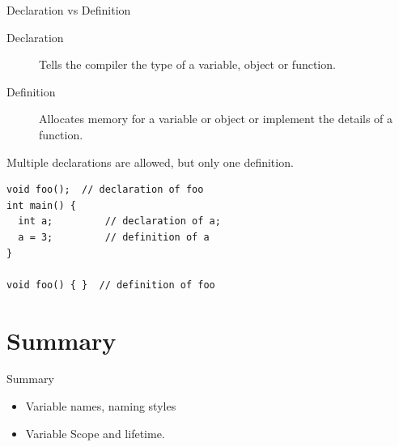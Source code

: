 \documentclass[presentation]{beamer}
\begin{document}
\begin{frame}[fragile,label={sec:orgheadline40}]{Declaration vs Definition}
 \begin{description}
\item[{Declaration}] Tells the compiler the type of a variable, object
or function.
\item[{Definition}] Allocates memory for a variable or object or
implement the details of a function.
\end{description}


Multiple declarations are allowed, but only one definition.

\begin{verbatim}
void foo();  // declaration of foo
int main() {
  int a;         // declaration of a;
  a = 3;         // definition of a
}

void foo() { }  // definition of foo
\end{verbatim}
\end{frame}

\section{Summary}
\label{sec:orgheadline43}

\begin{frame}[label={sec:orgheadline42}]{Summary}
\begin{itemize}
\item Variable names, naming styles
\item Variable Scope and lifetime.
\end{itemize}
\end{frame}
\end{document}
